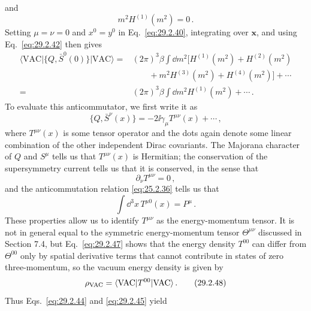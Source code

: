 and
\begin{equation}
  m^2H^{(1)}(m^2)=0\,.
  \tag{29.2.43}\label{eq:29.2.43}
\end{equation}
Setting \(\mu=\nu=0\) and \(x^0=y^0\) in Eq.~\eqref{eq:29.2.40},
integrating over \(\mathbf x\), and using Eq.~\eqref{eq:29.2.42} then
gives
\begin{equation}
  \begin{aligned}
  \langle\mathrm{VAC}\lvert
  \{Q,\bar S^0(0)\}\rvert\mathrm{VAC}\rangle
  ={}&(2\pi)^3\beta\int \dd m^2
  \bigl[
    H^{(1)}(m^2)+H^{(2)}(m^2)
  \\
  &\qquad
    +m^2H^{(3)}(m^2)+H^{(4)}(m^2)
  \bigr]
  +\cdots
  \\
  ={}&(2\pi)^3\beta\int \dd m^2H^{(1)}(m^2)+\cdots\,.
  \end{aligned}
  \tag{29.2.44}\label{eq:29.2.44}
\end{equation}
To evaluate this anticommutator, we first write it as
\begin{equation}
  \{Q,\bar S^\nu(x)\}
  =-2\ii\gamma_\mu T^{\mu\nu}(x)+\cdots\,,
  \tag{29.2.45}\label{eq:29.2.45}
\end{equation}
where \(T^{\mu\nu}(x)\) is some tensor operator and the dots again denote
some linear combination of the other independent Dirac covariants. The
Majorana character of \(Q\) and \(S^\mu\) tells us that \(T^{\mu\nu}(x)\)
is Hermitian; the conservation of the supersymmetry current tells us that
it is conserved, in the sense that
\begin{equation}
  \partial_\nu T^{\mu\nu}=0\,,
  \tag{29.2.46}\label{eq:29.2.46}
\end{equation}
and the anticommutation relation \eqref{eq:25.2.36} tells us that
\begin{equation}
  \int \dd^3x\,T^{\mu0}(x)=P^\mu\,.
  \tag{29.2.47}\label{eq:29.2.47}
\end{equation}
These properties allow us to identify \(T^{\mu\nu}\) as the
energy-momentum tensor. It is not in general equal to the symmetric
energy-momentum tensor \(\Theta^{\mu\nu}\) discussed in Section 7.4, but
Eq.~\eqref{eq:29.2.47} shows that the energy density \(T^{00}\) can
differ from \(\Theta^{00}\) only by spatial derivative terms that cannot
contribute in states of zero three-momentum, so the vacuum energy density
is given by
\begin{equation}
  \rho_{\mathrm{VAC}}
  =\langle \mathrm{VAC}\rvert T^{00}\lvert \mathrm{VAC}\rangle\,.
  \tag{29.2.48}\label{eq:29.2.48}
\end{equation}
Thus Eqs.~\eqref{eq:29.2.44} and \eqref{eq:29.2.45} yield

